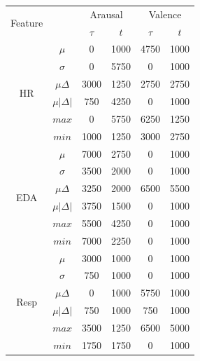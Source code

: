 \begin{table}[]
\centering
\begin{tabular}{|c|c|cc|cc|}
\hline
\multirow{2}{*}{Feature} & {\multirow{2}{*}{Attributo}} & \multicolumn{2}{c|}{Arausal} & \multicolumn{2}{c|}{Valence} \\
\cline{3-6}
                    &                             & \multicolumn{1}{c|}{$\tau$} & {$t$}  & \multicolumn{1}{c|}{$\tau$} & {$t$}  \\
\hline
\multirow{6}{*}{HR} & $\mu$                       & 0    & 1000 & 4750 & 1000 \\
                    & $\sigma$                    & 0    & 5750 & 0    & 1000 \\
                    & $\mu\Delta$                 & 3000 & 1250 & 2750 & 2750 \\
                    & $\mu\left|\Delta\right|$    & 750  & 4250 & 0    & 1000 \\
                    & $max$                       & 0    & 5750 & 6250 & 1250 \\
                    & $min$                       & 1000 & 1250 & 3000 & 2750 \\
\hline
\multirow{6}{*}{EDA} & $\mu$                      & 7000 & 2750 & 0    & 1000 \\
                     & $\sigma$                   & 3500 & 2000 & 0    & 1000 \\
                     & $\mu\Delta$                & 3250 & 2000 & 6500 & 5500 \\
                     & $\mu\left|\Delta\right|$   & 3750 & 1500 & 0    & 1000 \\
                     & $max$                      & 5500 & 4250 & 0    & 1000 \\
                     & $min$                      & 7000 & 2250 & 0    & 1000 \\
\hline
\multirow{6}{*}{Resp} & $\mu$                     & 3000 & 1000 & 0    & 1000 \\
                      & $\sigma$                  & 750  & 1000 & 0    & 1000 \\
                      & $\mu\Delta$               & 0    & 1000 & 5750 & 1000 \\
                      & $\mu\left|\Delta\right|$  & 750  & 1000 & 750  & 1000 \\
                      & $max$                     & 3500 & 1250 & 6500 & 5000 \\
                      & $min$                     & 1750 & 1750 & 0    & 1000 \\

\end{tabular}
\end{table}
